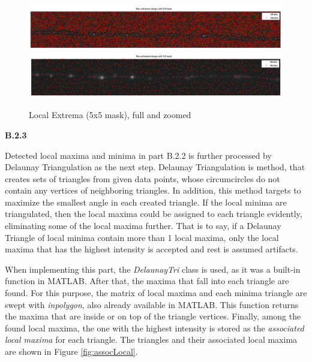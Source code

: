 \documentclass{article}
\begin{document}
\begin{figure}[h]
\centering
\includegraphics[width=16cm]{figures/extrema_5_full.png}
\includegraphics[width=16cm]{figures/extrema_5_zoom.png}
\caption{Local Extrema (5x5 mask), full and zoomed}
\label{fig:extrema_5}
\end{figure}



\textbf{B.2.3}

Detected local maxima and minima in part B.2.2 is further processed by Delaunay Triangulation\cite{delaunaywiki}\cite{delaunaymathworks} as the next step. Delaunay Triangulation is method, that creates sets of triangles from given data points, whose circumcircles do not contain any vertices of neighboring triangles. In addition, this method targets to maximize the smallest angle in each created triangle. If the local minima are triangulated, then the local maxima could be assigned to each triangle evidently, eliminating some of the local maxima further. That is to say, if a Delaunay Triangle of local minima contain more than 1 local maxima, only the local maxima that has the highest intensity is accepted and rest is assumed artifacts.

When implementing this part, the \emph{DelaunayTri} class is used, as it was a built-in function in MATLAB. After that, the maxima that fall into each triangle are found. For this purpose, the matrix of local maxima and each minima triangle are swept with \emph{inpolygon}, also already available in MATLAB. This function returns the maxima that are inside or on top of the triangle vertices. Finally, among the found local maxima, the one with the highest intensity is stored as the \emph{associated local maxima} for each triangle. The triangles and their associated local maxima are shown in Figure \ref{fig:assocLocal}.
\end{document}
